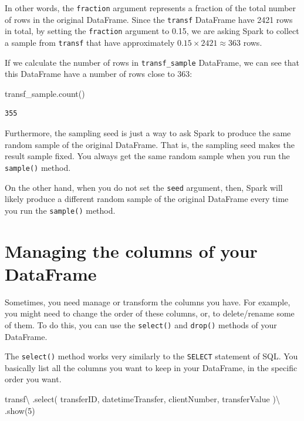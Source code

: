 \documentclass[
  11pt,
  letterpaper,
  DIV=11,
  numbers=noendperiod]{scrreprt}
\newenvironment{Shaded}{\begin{snugshade}}{\end{snugshade}}
\newcommand{\DecValTok}[1]{\textcolor[rgb]{0.68,0.00,0.00}{#1}}
\newcommand{\NormalTok}[1]{\textcolor[rgb]{0.00,0.23,0.31}{#1}}
\newcommand{\OperatorTok}[1]{\textcolor[rgb]{0.37,0.37,0.37}{#1}}
\newcommand{\StringTok}[1]{\textcolor[rgb]{0.13,0.47,0.30}{#1}}
\begin{document}
In other words, the \texttt{fraction} argument represents a fraction of
the total number of rows in the original DataFrame. Since the
\texttt{transf} DataFrame have 2421 rows in total, by setting the
\texttt{fraction} argument to 0.15, we are asking Spark to collect a
sample from \texttt{transf} that have approximately
\(0.15 \times 2421 \approx 363\) rows.

If we calculate the number of rows in \texttt{transf\_sample} DataFrame,
we can see that this DataFrame have a number of rows close to 363:

\begin{Shaded}
\begin{Highlighting}[]
\NormalTok{transf\_sample.count()}
\end{Highlighting}
\end{Shaded}

\begin{verbatim}
355
\end{verbatim}

Furthermore, the sampling seed is just a way to ask Spark to produce the
same random sample of the original DataFrame. That is, the sampling seed
makes the result sample fixed. You always get the same random sample
when you run the \texttt{sample()} method.

On the other hand, when you do not set the \texttt{seed} argument, then,
Spark will likely produce a different random sample of the original
DataFrame every time you run the \texttt{sample()} method.

\hypertarget{managing-the-columns-of-your-dataframe}{%
\section{Managing the columns of your
DataFrame}\label{managing-the-columns-of-your-dataframe}}

Sometimes, you need manage or transform the columns you have. For
example, you might need to change the order of these columns, or, to
delete/rename some of them. To do this, you can use the
\texttt{select()} and \texttt{drop()} methods of your DataFrame.

The \texttt{select()} method works very similarly to the \texttt{SELECT}
statement of SQL. You basically list all the columns you want to keep in
your DataFrame, in the specific order you want.

\begin{Shaded}
\begin{Highlighting}[]
\NormalTok{transf}\OperatorTok{\textbackslash{}}
\NormalTok{  .select(}
    \StringTok{\textquotesingle{}transferID\textquotesingle{}}\NormalTok{, }\StringTok{\textquotesingle{}datetimeTransfer\textquotesingle{}}\NormalTok{,}
    \StringTok{\textquotesingle{}clientNumber\textquotesingle{}}\NormalTok{, }\StringTok{\textquotesingle{}transferValue\textquotesingle{}}
\NormalTok{  )}\OperatorTok{\textbackslash{}}
\NormalTok{  .show(}\DecValTok{5}\NormalTok{)}
\end{Highlighting}
\end{Shaded}
\end{document}
